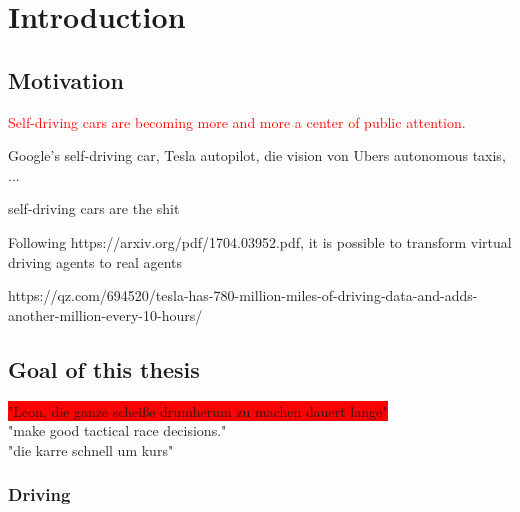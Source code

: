 
\chapter{Introduction} %

\label{ch:intro} %


\newcommand{\keyword}[1]{\textit{#1}}
\newcommand{\tabhead}[1]{\textbf{#1}}
\newcommand{\code}[1]{\texttt{#1}}
\newcommand{\file}[1]{\texttt{\bfseries#1}}
\newcommand{\option}[1]{\texttt{\itshape#1}}
\newcommand{\batchnorm}{batch normalization }
\newcommand{\Batchnorm}{Batch normalization }



\section{Motivation}

\textcolor{red}{Self-driving cars are becoming more and more a center of public attention.}

Google's self-driving car, Tesla autopilot, die vision von Ubers autonomous taxis, ...

self-driving cars are the shit

Following https://arxiv.org/pdf/1704.03952.pdf, it is possible to transform virtual driving agents to real agents

https://qz.com/694520/tesla-has-780-million-miles-of-driving-data-and-adds-another-million-every-10-hours/

\section{Goal of this thesis}

\colorbox{red}{"Leon, die ganze scheiße drumherum zu machen dauert lange"}\\
"make good tactical race decisions."\\
"die karre schnell um kurs"

\subsection{Driving}

